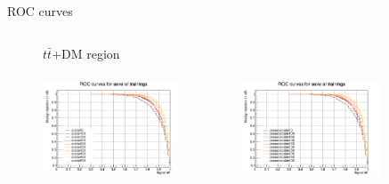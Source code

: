 \documentclass[8pt]{beamer}
\begin{document}
\begin{frame}{ROC curves}
\begin{figure}[htbp]
\begin{columns}
\begin{column}{1.09\textwidth}
\begin{block}{\centering $t \bar t$+DM region}\end{block} \vspace{10pt}
\end{column}
\end{columns} \vspace{-16pt}

\begin{columns}
\begin{column}[b]{.50\textwidth}
\begin{center}
\includegraphics[width=4.2cm, height=3.2cm]{figs/groupedROC_scalar_TTbar.png}
\end{center}
\end{column} \hfill
\begin{column}[b]{.50\textwidth}
\begin{center}
\includegraphics[width=4.2cm, height=3.2cm]{figs/groupedROC_pseudo_TTbar.png}
\end{center}
\end{column} \hfill
\end{columns} \vfill
\label{fig:ROC2}
\end{figure}
\end{frame}


\end{document}
